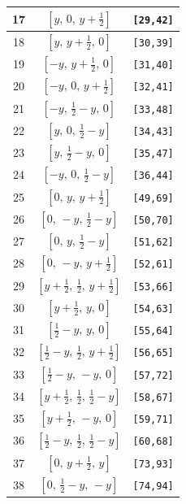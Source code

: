 \documentclass[fleqn,8pt]{jsarticle}
\begin{document}
\begin{longtable}{ccc}
17 & $\left[ y,\, 0,\, y + \frac{1}{2} \right]$ & {\tt [29,42]} \\ \hline
18 & $\left[ y,\, y + \frac{1}{2},\, 0 \right]$ & {\tt [30,39]} \\ \hline
19 & $\left[ - y,\, y + \frac{1}{2},\, 0 \right]$ & {\tt [31,40]} \\ \hline
20 & $\left[ - y,\, 0,\, y + \frac{1}{2} \right]$ & {\tt [32,41]} \\ \hline
21 & $\left[ - y,\, \frac{1}{2} - y,\, 0 \right]$ & {\tt [33,48]} \\ \hline
22 & $\left[ y,\, 0,\, \frac{1}{2} - y \right]$ & {\tt [34,43]} \\ \hline
23 & $\left[ y,\, \frac{1}{2} - y,\, 0 \right]$ & {\tt [35,47]} \\ \hline
24 & $\left[ - y,\, 0,\, \frac{1}{2} - y \right]$ & {\tt [36,44]} \\ \hline
25 & $\left[ 0,\, y,\, y + \frac{1}{2} \right]$ & {\tt [49,69]} \\ \hline
26 & $\left[ 0,\, - y,\, \frac{1}{2} - y \right]$ & {\tt [50,70]} \\ \hline
27 & $\left[ 0,\, y,\, \frac{1}{2} - y \right]$ & {\tt [51,62]} \\ \hline
28 & $\left[ 0,\, - y,\, y + \frac{1}{2} \right]$ & {\tt [52,61]} \\ \hline
29 & $\left[ y + \frac{1}{2},\, \frac{1}{2},\, y + \frac{1}{2} \right]$ & {\tt [53,66]} \\ \hline
30 & $\left[ y + \frac{1}{2},\, y,\, 0 \right]$ & {\tt [54,63]} \\ \hline
31 & $\left[ \frac{1}{2} - y,\, y,\, 0 \right]$ & {\tt [55,64]} \\ \hline
32 & $\left[ \frac{1}{2} - y,\, \frac{1}{2},\, y + \frac{1}{2} \right]$ & {\tt [56,65]} \\ \hline
33 & $\left[ \frac{1}{2} - y,\, - y,\, 0 \right]$ & {\tt [57,72]} \\ \hline
34 & $\left[ y + \frac{1}{2},\, \frac{1}{2},\, \frac{1}{2} - y \right]$ & {\tt [58,67]} \\ \hline
35 & $\left[ y + \frac{1}{2},\, - y,\, 0 \right]$ & {\tt [59,71]} \\ \hline
36 & $\left[ \frac{1}{2} - y,\, \frac{1}{2},\, \frac{1}{2} - y \right]$ & {\tt [60,68]} \\ \hline
37 & $\left[ 0,\, y + \frac{1}{2},\, y \right]$ & {\tt [73,93]} \\ \hline
38 & $\left[ 0,\, \frac{1}{2} - y,\, - y \right]$ & {\tt [74,94]} \\ \hline

\end{longtable}
\end{document}

